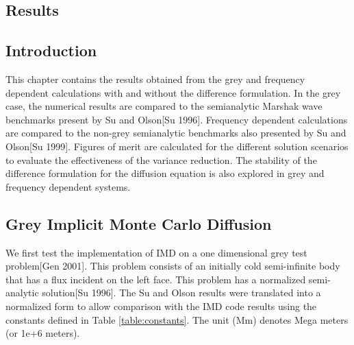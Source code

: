
\begin{center}
\section{Results}
\label{sec:Results}
\end{center}

\aboveSubSecSkip

\subsection{Introduction}
\label{sec:Results-Intro}

\noindent
	\indent This chapter contains the results obtained from the grey and frequency dependent calculations with and without the difference formulation. In the grey case, the numerical results are compared to the semianalytic Marshak wave benchmarks present by Su and Olson[Su 1996]. Frequency dependent calculations are compared to the non-grey semianalytic benchmarks also presented by Su and Olson[Su 1999]. Figures of merit are calculated for the different solution scenarios to evaluate the effectiveness of the variance reduction. The stability of the difference formulation for the diffusion equation is also explored in grey and frequency dependent systems. 
				
\belowSubSecSkip

\subsection{Grey Implicit Monte Carlo Diffusion}
\label{sec:Grey}

\noindent
	\indent We first test the implementation of IMD on a one dimensional grey test problem[Gen 2001]. This problem consists of an initially cold semi-infinite body that has a flux incident on the left face. This problem has a normalized semi-analytic solution[Su 1996].  The Su and Olson results were translated into a normalized form to allow comparison with the IMD code results using the constants defined in Table \ref{table:constants}. The unit (Mm) denotes Mega meters (or 1e+6 meters).

